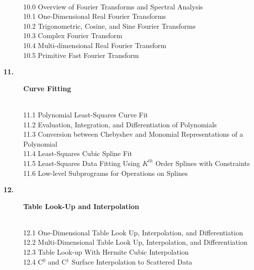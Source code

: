 \documentclass[twoside]{MATH77}
\begin{document}
\begin{description}
\vspace{-20pt}
\begin{tabbing}
\hspace{.45in}\=\\
10.0 \> Overview of Fourier Transforms and Spectral Analysis\\
10.1 \> One-Dimensional Real Fourier Transforms\\
10.2 \> Trigonometric, Cosine, and Sine Fourier Transforms\\
10.3 \> Complex Fourier Transform\\
10.4 \> Multi-dimensional Real Fourier Transform\\
10.5 \> Primitive Fast Fourier Transform\\
\end{tabbing}\vspace{-15pt}

\item[\large \bf 11.]  {\large {\bf Curve Fitting}}

\vspace{-20pt}
\begin{tabbing}
\hspace{.45in}\=\\
11.1 \> Polynomial Least-Squares Curve Fit\\
11.2 \> Evaluation, Integration, and Differentiation of Polynomials\\
11.3 \> Conversion between Chebyshev and Monomial Representations of a
Polynomial\\
11.4 \> Least-Squares Cubic Spline Fit\\
11.5 \> Least-Squares Data Fitting Using $K^{th}$ Order Splines with
Constraints\\
11.6 \> Low-level Subprograms for Operations on Splines\\
\end{tabbing}\vspace{-15pt}

\item[\large \bf 12.] {\large {\bf Table Look-Up and Interpolation}}

\vspace{-20pt}
\begin{tabbing}
\hspace{.45in}\=\\
12.1 \> One-Dimensional Table Look Up, Interpolation, and
Differentiation\\
12.2 \> Multi-Dimensional Table Look Up, Interpolation, and
Differentiation\\
12.3 \> Table Look-up With Hermite Cubic Interpolation\\
12.4 \> C$^0$ and C$^1$ Surface Interpolation to Scattered Data\\
\end{tabbing}\vspace{-15pt}


\end{description}
\end{document}
